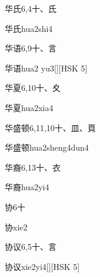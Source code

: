 \begin{Entry}{华氏}{6,4}{⼗、⽒}
  \begin{Phonetics}{华氏}{hua2shi4}
  \end{Phonetics}
\end{Entry}

\begin{Entry}{华语}{6,9}{⼗、⾔}
  \begin{Phonetics}{华语}{hua2 yu3}[][HSK 5]
  \end{Phonetics}
\end{Entry}

\begin{Entry}{华夏}{6,10}{⼗、⼢}
  \begin{Phonetics}{华夏}{hua2xia4}
  \end{Phonetics}
\end{Entry}

\begin{Entry}{华盛顿}{6,11,10}{⼗、⽫、⾴}
  \begin{Phonetics}{华盛顿}{hua2sheng4dun4}
  \end{Phonetics}
\end{Entry}

\begin{Entry}{华裔}{6,13}{⼗、⾐}
  \begin{Phonetics}{华裔}{hua2yi4}
  \end{Phonetics}
\end{Entry}

\begin{Entry}{协}{6}{⼗}
  \begin{Phonetics}{协}{xie2}
  \end{Phonetics}
\end{Entry}

\begin{Entry}{协议}{6,5}{⼗、⾔}
  \begin{Phonetics}{协议}{xie2yi4}[][HSK 5]
  \end{Phonetics}
\end{Entry}

